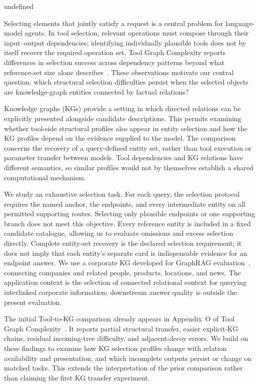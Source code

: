undefined
\label{sec:intro}

Selecting elements that jointly satisfy a request is a central problem for language-model agents. In tool selection, relevant operations must compose through their input--output dependencies; identifying individually plausible tools does not by itself recover the required operation set. Tool Graph Complexity reports differences in selection success across dependency patterns beyond what reference-set size alone describes~\cite{anonymousToolGraph}. These observations motivate our central question: which structural selection difficulties persist when the selected objects are knowledge-graph entities connected by factual relations?

Knowledge graphs (KGs) provide a setting in which directed relations can be explicitly presented alongside candidate descriptions. This permits examining whether tool-side structural profiles also appear in entity selection and how the KG profiles depend on the evidence supplied to the model. The comparison concerns the recovery of a query-defined entity set, rather than tool execution or parameter transfer between models. Tool dependencies and KG relations have different semantics, so similar profiles would not by themselves establish a shared computational mechanism.

We study an exhaustive selection task. For each query, the selection protocol requires the named anchor, the endpoints, and every intermediate entity on all permitted supporting routes. Selecting only plausible endpoints or one supporting branch does not meet this objective. Every reference entity is included in a fixed candidate catalogue, allowing us to evaluate omissions and excess selection directly. Complete entity-set recovery is the declared selection requirement; it does not imply that each entity's separate card is indispensable evidence for an endpoint answer. We use a corporate KG developed for GraphRAG evaluation~\cite{kirpichev2026towards}, connecting companies and related people, products, locations, and news. The application context is the selection of connected relational context for querying interlinked corporate information; downstream answer quality is outside the present evaluation.

The initial Tool-to-KG comparison already appears in Appendix~O of Tool Graph Complexity~\cite{anonymousToolGraph}. It reports partial structural transfer, easier explicit-KG chains, residual incoming-tree difficulty, and adjacent-decoy errors. We build on these findings to examine how KG selection profiles change with relation availability and presentation, and which incomplete outputs persist or change on matched tasks. This extends the interpretation of the prior comparison rather than claiming the first KG transfer experiment.

